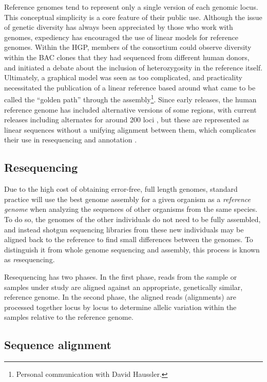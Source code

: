 Reference genomes tend to represent only a single version of each genomic locus.
This conceptual simplicity is a core feature of their public use.
Although the issue of genetic diversity has always been appreciated by those who work with genomes, expediency has encouraged the use of linear models for reference genomes.
Within the HGP, members of the consortium could observe diversity within the BAC clones that they had sequenced from different human donors, and initiated a debate about the inclusion of heterozygosity in the reference itself.
Ultimately, a graphical model was seen as too complicated, and practicality necessitated the publication of a linear reference based around what came to be called the ``golden path'' through the assembly\footnote{Personal communication with David Haussler.}.
Since early releases, the human reference genome has included alternative versions of some regions, with current releases including alternates for around 200 loci \cite{schneider2017evaluation,church2018genomes}, but these are represented as linear sequences without a unifying alignment between them, which complicates their use in resequencing and annotation \cite{jager2016alternate}.

\subsection{Resequencing}

Due to the high cost of obtaining error-free, full length genomes, standard practice will use the best genome assembly for a given organism as a \emph{reference genome} when analyzing the sequences of other organisms from the same species.
To do so, the genomes of the other individuals do not need to be fully assembled, and instead shotgun sequencing libraries from these new individuals may be aligned back to the reference to find small differences between the genomes.
To distinguish it from whole genome sequencing and assembly, this process is known as \emph{re}sequencing.

Resequencing has two phases.
In the first phase, reads from the sample or samples under study are aligned against an appropriate, genetically similar, reference genome.
In the second phase, the aligned reads (alignments) are processed together locus by locus to determine allelic variation within the samples relative to the reference genome.

\subsection{Sequence alignment}
\label{sec:sequence_alignment}

